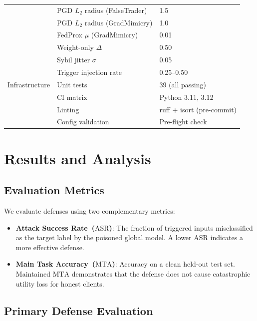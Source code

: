 \documentclass[journal]{IEEEtran}
\newcommand{\asr}{\ensuremath{\mathrm{ASR}}}
\newcommand{\mta}{\ensuremath{\mathrm{MTA}}}
\begin{document}
\begin{table}[!tp]
\begin{tabular}{lll}
 & PGD $L_2$ radius (FalseTrader) & 1.5 \\
 & PGD $L_2$ radius (GradMimicry) & 1.0 \\
 & FedProx $\mu$ (GradMimicry) & 0.01 \\
 & Weight-only $\Delta$ & 0.50 \\
 & Sybil jitter $\sigma$ & 0.05 \\
 & Trigger injection rate & 0.25--0.50 \\
\hline
Infrastructure & Unit tests & 39 (all passing) \\
 & CI matrix & Python 3.11, 3.12 \\
 & Linting & ruff + isort (pre-commit) \\
 & Config validation & Pre-flight check \\
\hline
\end{tabular}
\end{table}

\section{Results and Analysis}
\label{sec:results}

\subsection{Evaluation Metrics}
\label{sec:metrics}

We evaluate defenses using two complementary metrics:
\begin{itemize}
  \item \textbf{Attack Success Rate~(\asr{})}: The fraction of triggered
        inputs misclassified as the target label by the poisoned global model.
        A lower \asr{} indicates a more effective defense.
  \item \textbf{Main Task Accuracy~(\mta{})}: Accuracy on a clean held-out
        test set. Maintained \mta{} demonstrates that the defense does not
        cause catastrophic utility loss for honest clients.
\end{itemize}

\subsection{Primary Defense Evaluation}
\end{document}
